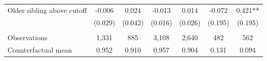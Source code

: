 {{\begin{tabular}{lcccccc}
Older sibling above cutoff&      -0.006   &       0.024   &      -0.013   &       0.014   &      -0.072   &       0.421** \\
                    &     (0.029)   &     (0.042)   &     (0.016)   &     (0.026)   &     (0.195)   &     (0.195)   \\
                    &               &               &               &               &               &               \\
Observations        &       1,331   &         885   &       3,108   &       2,640   &         482   &         562   \\
Counterfactual mean &       0.952   &       0.910   &       0.957   &       0.904   &       0.131   &       0.094   \\
 

\bottomrule
\end{tabular}
}
}
